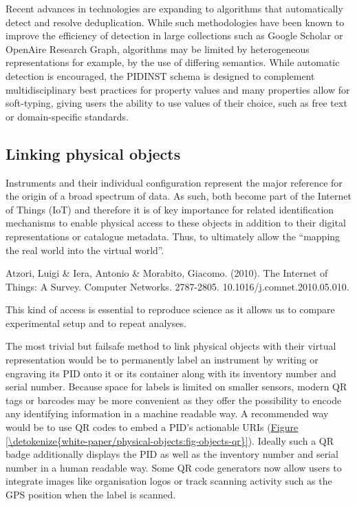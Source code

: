 \documentclass[a4paper,10pt,english]{sphinxmanual}
\begin{document}
Recent advances in technologies are expanding to algorithms that
automatically detect and resolve deduplication. While such methodologies
have been known to improve the efficiency of detection in large
collections such as Google Scholar or OpenAire Research Graph,
algorithms may be limited by heterogeneous representations for example,
by the use of differing semantics. While automatic detection is
encouraged, the PIDINST schema is designed to complement
multidisciplinary best practices for property values and many properties
allow for soft-typing, giving users the ability to use values of their
choice, such as free text or domain-specific standards.


\subsection{Linking physical objects}
\label{\detokenize{white-paper/physical-objects:linking-physical-objects}}\label{\detokenize{white-paper/physical-objects::doc}}
Instruments and their individual configuration represent the major
reference for the origin of a broad spectrum of data. As such, both
become part of the Internet of Things (IoT) and therefore it is of key
importance for related identification mechanisms to enable physical
access to these objects in addition to their digital representations or
catalogue metadata. Thus, to ultimately allow the “mapping the real
world into the virtual world”.%
\begin{footnote}[1]\sphinxAtStartFootnote
Atzori, Luigi \& Iera, Antonio \& Morabito, Giacomo. (2010). The
Internet of Things: A Survey. Computer Networks. 2787-2805.
10.1016/j.comnet.2010.05.010.
%
\end{footnote} This kind of access is
essential to reproduce science as it allows us to compare experimental
setup and to repeat analyses.

The most trivial but failsafe method to link physical objects with their
virtual representation would be to permanently label an instrument by
writing or engraving its PID onto it or its container along with its
inventory number and serial number. Because space for labels is limited
on smaller sensors, modern QR tags or barcodes may be more convenient as
they offer the possibility to encode any identifying information in a
machine readable way. A recommended way would be to use QR codes to
embed a PID’s actionable URIs (\hyperref[\detokenize{white-paper/physical-objects:fig-objects-qr}]{Figure \ref{\detokenize{white-paper/physical-objects:fig-objects-qr}}}). Ideally such
a QR badge additionally displays the PID as well as the inventory
number and serial number in a human readable way. Some QR code
generators now allow users to integrate images like organisation logos
or track scanning activity such as the GPS position when the label is
scanned.
\end{document}
